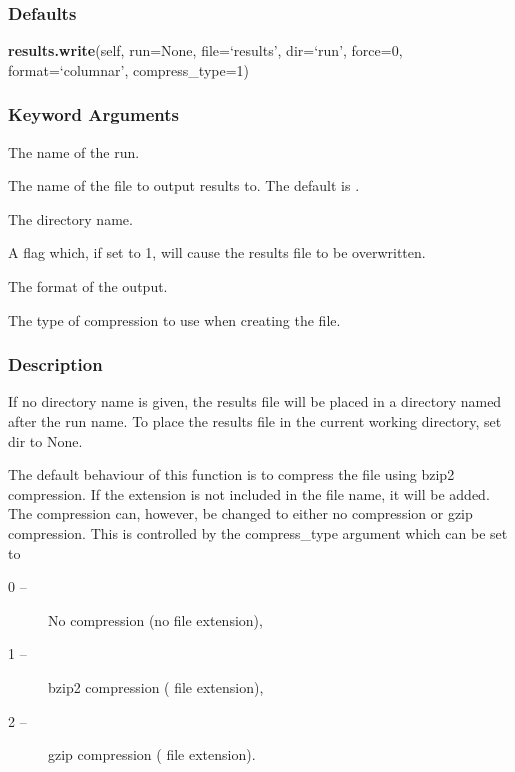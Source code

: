 \subsubsection{Defaults}

\textsf{\textbf{results.write}(self, run=None, file=`results', dir=`run', force=0, format=`columnar', compress\_type=1)}


\subsubsection{Keyword Arguments}

  The name of the run. 

  The name of the file to output results to.  The default is . 

  The directory name. 

  A flag which, if set to 1, will cause the results file to be overwritten. 

  The format of the output. 

  The type of compression to use when creating the file. 




\subsubsection{Description}

If no directory name is given, the results file will be placed in a directory named after the run name.  To place the results file in the current working directory, set dir to None.


The default behaviour of this function is to compress the file using bzip2 compression.  If the extension  is not included in the file name, it will be added.  The compression can, however, be changed to either no compression or gzip compression.  This is controlled by the compress\_type argument which can be set to


\begin{description}
\item[0 --]  No compression (no file extension), 
\item[1 --]  bzip2 compression ( file extension), 
\item[2 --]  gzip compression ( file extension). 
\end{description}


